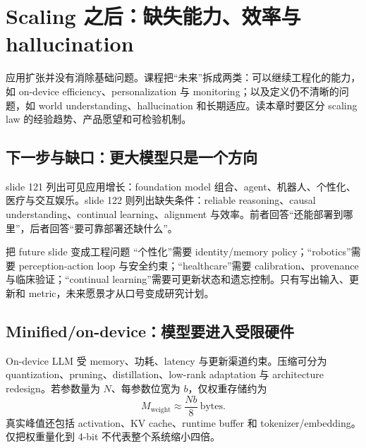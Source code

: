 \section{Scaling 之后：缺失能力、效率与 hallucination}

应用扩张并没有消除基础问题。课程把“未来”拆成两类：可以继续工程化的能力，如 on-device efficiency、personalization 与 monitoring；以及定义仍不清晰的问题，如 world understanding、hallucination 和长期适应。读本章时要区分 scaling law 的经验趋势、产品愿望和可检验机制。

\subsection{下一步与缺口：更大模型只是一个方向}

slide 121 列出可见应用增长：foundation model 组合、agent、机器人、个性化、医疗与交互娱乐。slide 122 则列出缺失条件：reliable reasoning、causal understanding、continual learning、alignment 与效率。前者回答“还能部署到哪里”，后者回答“要可靠部署还缺什么”。




\begin{knowledgebox}{把 future slide 变成工程问题}
“个性化”需要 identity/memory policy；“robotics”需要 perception-action loop 与安全约束；“healthcare”需要 calibration、provenance 与临床验证；“continual learning”需要可更新状态和遗忘控制。只有写出输入、更新和 metric，未来愿景才从口号变成研究计划。
\end{knowledgebox}

\subsection{Minified/on-device：模型要进入受限硬件}

On-device LLM 受 memory、功耗、latency 与更新渠道约束。压缩可分为 quantization、pruning、distillation、low-rank adaptation 与 architecture redesign。若参数量为 $N$、每参数位宽为 $b$，仅权重存储约为
\[
M_{\mathrm{weight}}\approx \frac{Nb}{8}\ \text{bytes}.
\]
真实峰值还包括 activation、KV cache、runtime buffer 和 tokenizer/embedding。仅把权重量化到 4-bit 不代表整个系统缩小四倍。

